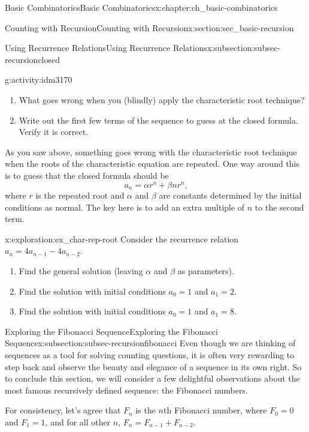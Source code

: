 \documentclass[oneside,10pt,]{book}
\numberwithin{equation}{chapter}
\begin{document}
\begin{chapterptx}{Basic Combinatorics}{}{Basic Combinatorics}{}{}{x:chapter:ch_basic-combinatorics}
\begin{sectionptx}{Counting with Recursion}{}{Counting with Recursion}{}{}{x:section:sec_basic-recursion}
\begin{subsectionptx}{Using Recurrence Relations}{}{Using Recurrence Relations}{}{}{x:subsection:subsec-recursionclosed}
\begin{activity}{}{g:activity:idm3170}
\begin{enumerate}[font=\bfseries,label=(\alph*),ref=\alph*]
\item{}What goes wrong when you (blindly) apply the characteristic root technique?%
\item{}Write out the first few terms of the sequence to guess at the closed formula.  Verify it is correct.%
\end{enumerate}
\end{activity}
As you saw above, something goes wrong with the characteristic root technique when the roots of the characteristic equation are repeated.  One way around this is to guess that the closed formula should be%
\begin{equation*}
a_n = \alpha r^n + \beta nr^n\text{,}
\end{equation*}
where \(r\) is the repeated root and \(\alpha\) and \(\beta\) are constants determined by the initial conditions as normal. The key here is to add an extra multiple of \(n\) to the second term.%
\begin{exploration}{}{x:exploration:ex_char-rep-root}%
Consider the recurrence relation \(a_n = 4a_{n-1} - 4a_{n-2}\).%
\begin{enumerate}[font=\bfseries,label=(\alph*),ref=\alph*]
\item{}Find the general solution (leaving \(\alpha\) and \(\beta\) as parameters).%
\item{}Find the solution with initial conditions \(a_0 = 1\) and \(a_1 = 2\).%
\item{}Find the solution with initial conditions \(a_0 = 1\) and \(a_1 = 8\).%
\end{enumerate}
\end{exploration}
\end{subsectionptx}
%
%
\typeout{************************************************}
\typeout{************************************************}
%
\begin{subsectionptx}{Exploring the Fibonacci Sequence}{}{Exploring the Fibonacci Sequence}{}{}{x:subsection:subsec-recursionfibonacci}
Even though we are thinking of sequences as a tool for solving counting questions, it is often very rewarding to step back and observe the beauty and elegance of a sequence in its own right.  So to conclude this section, we will consider a few delightful observations about the most famous recursively defined sequence: the Fibonacci numbers.%
\par
For consistency, let's agree that \(F_n\) is the \(n\)th Fibonacci number, where \(F_0 = 0\) and \(F_1 = 1\), and for all other \(n\), \(F_n = F_{n-1} + F_{n-2}\).%

\end{subsectionptx}
\end{sectionptx}
\end{chapterptx}
\end{document}
